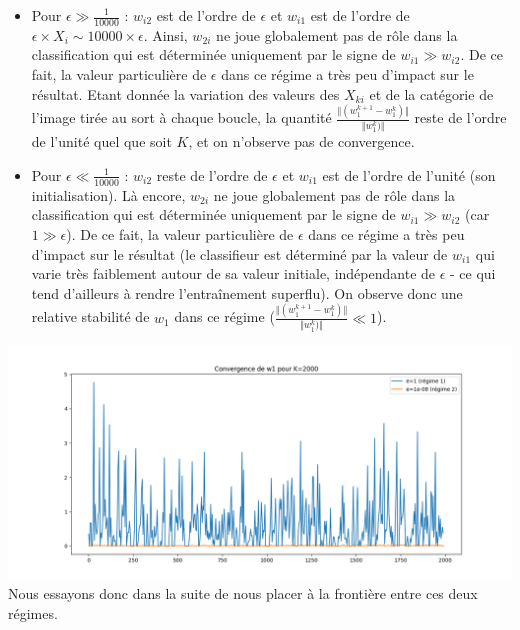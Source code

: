 \documentclass[a4paper,11pt]{article}
\begin{document}
	\begin{itemize}
		\item Pour $\epsilon \gg \frac{1}{10000}$ : $w_{i2}$ est de l'ordre de $\epsilon$ et $w_{i1}$ est de l'ordre de $\epsilon \times X_i \sim 10000 \times \epsilon$. Ainsi, $w_{2i}$ ne joue globalement pas de rôle dans la classification qui est déterminée uniquement par le signe de $w_{i1} \gg w_{i2}$. De ce fait, la valeur particulière de $\epsilon$ dans ce régime a très peu d'impact sur le résultat. Etant donnée la variation des valeurs des $X_{ki}$ et de la catégorie de l'image tirée au sort à chaque boucle, la quantité $  \frac{\Vert(w_1^{k+1} - w_1^{k})\Vert}{\Vert w_1^{k})\Vert}$ reste de l'ordre de l'unité quel que soit $K$, et on n'observe pas de convergence.\\
		
		\item Pour $\epsilon \ll \frac{1}{10000}$ : $w_{i2}$ reste de l'ordre de $\epsilon$ et $w_{i1}$ est de l'ordre de l'unité (son initialisation). Là encore, $w_{2i}$ ne joue globalement pas de rôle dans la classification qui est déterminée uniquement par le signe de $w_{i1} \gg w_{i2}$ (car $1 \gg \epsilon$). De ce fait, la valeur particulière de $\epsilon$ dans ce régime a très peu d'impact sur le résultat (le classifieur est déterminé par la valeur de $w_{i1}$ qui varie très faiblement autour de sa valeur initiale, indépendante de $\epsilon$ - ce qui tend d'ailleurs à rendre l'entraînement superflu). On observe donc une relative stabilité de $w_1$ dans ce régime ($  \frac{\Vert(w_1^{k+1} - w_1^{k})\Vert}{\Vert w_1^{k})\Vert} \ll 1$). \\
	\end{itemize}
\includegraphics[width=15cm]{"Fig4 Cv w1 2 regimes"}\\


Nous essayons donc dans la suite de nous placer à la frontière entre ces deux régimes.\\
\end{document}
